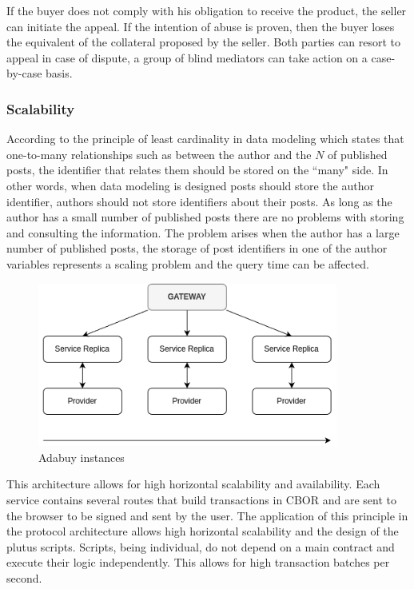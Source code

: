 \documentclass[12pt]{article}
\begin{document}
If the buyer does not comply with his obligation to receive the product, the seller can initiate the appeal. If the intention of abuse is proven, then the buyer loses the equivalent of the collateral proposed by the seller. Both parties can resort to appeal in case of dispute, a group of blind mediators can take action on a case-by-case basis.

\subsubsection { Scalability } 

According to the principle of least cardinality in data modeling which states that one-to-many relationships such as between the author and the $N$ of published posts, the identifier that relates them should be stored on the ``many" side. In other words, when data modeling is designed posts should store the author identifier, authors should not store identifiers about their posts. As long as the author has a small number of published posts there are no problems with storing and consulting the information. The problem arises when the author has a large number of published posts, the storage of post identifiers in one of the author variables represents a scaling problem and the query time can be affected.


\begin{figure}[ht]
  \centering
  \includegraphics[width=0.88\textwidth, keepaspectratio]{scalability.png}
  \caption{Adabuy instances}
  \label{fig:delivered}
\end{figure}

This architecture allows for high horizontal scalability and availability. Each service contains several routes that build transactions in CBOR and are sent to the browser to be signed and sent by the user. 
The application of this principle in the protocol architecture allows high horizontal scalability and the design of the plutus scripts. Scripts, being individual, do not depend on a main contract and execute their logic independently. This allows for high transaction batches per second.
\end{document}
